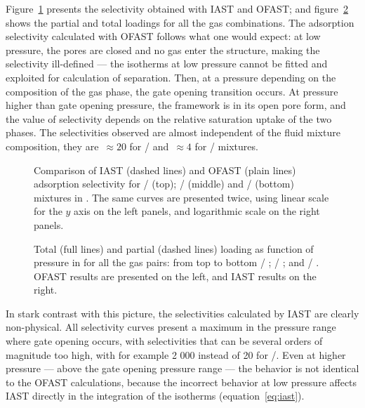\documentclass[thesis]{subfiles}
\begin{document}
Figure~\ref{fig:cu-dhbc:iast-ofast:selectivity} presents the selectivity
obtained with IAST and OFAST; and figure~\ref{fig:cu-dhbc:iast-ofast:loadings}
shows the partial and total loadings for all the gas combinations. The
adsorption selectivity calculated with OFAST follows what one would expect: at
low pressure, the pores are closed and no gas enter the structure, making the
selectivity ill-defined --- the isotherms at low pressure cannot be fitted and
exploited for calculation of separation. Then, at a pressure depending on the
composition of the gas phase, the gate opening transition occurs. At pressure
higher than gate opening pressure, the framework is in its open pore form, and
the value of selectivity depends on the relative saturation uptake of the two
phases. The selectivities observed are almost independent of the fluid mixture
composition, they are~$\approx 20$ for / and~$\approx 4$ for
/ mixtures.

\begin{figure}[htp]
    \centering
    
    \caption{Comparison of IAST (dashed lines) and OFAST (plain lines)
    adsorption selectivity for / (top); / (middle)
    and / (bottom) mixtures in \Cudhbc. The same curves are
    presented twice, using linear scale for the $y$ axis on the left panels, and
    logarithmic scale on the right panels.}
    \label{fig:cu-dhbc:iast-ofast:selectivity}
\end{figure}

\begin{figure}[htp]
    \centering
    
    \caption{Total (full lines) and partial (dashed lines) loading as function
    of pressure in \Cudhbc for all the gas pairs: from top to bottom  /
    ;  / ; and  / . OFAST results are
    presented on the left, and IAST results on the right.}
    \label{fig:cu-dhbc:iast-ofast:loadings}
\end{figure}

In stark contrast with this picture, the selectivities calculated by IAST are
clearly non-physical. All selectivity curves present a maximum in the pressure
range where gate opening occurs, with selectivities that can be several orders
of magnitude too high, with for example 2 000 instead of 20 for
/. Even at higher pressure --- above the gate opening pressure
range --- the behavior is not identical to the OFAST calculations, because the
incorrect behavior at low pressure affects IAST directly in the integration of
the isotherms (equation~\eqref{eq:iast}).
\end{document}
